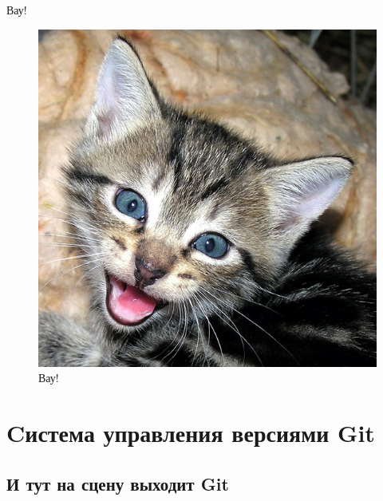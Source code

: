 \documentclass[presentation]{beamer}
\begin{document}
\begin{frame}{Вау!}
      \begin{figure}[htb]
        \centering
        \includegraphics[width=.8\textheight]{kitty-meowing}
        \caption{\LARGE Вау!}
      \end{figure}
\end{frame}



\section{Cистема управления версиями Git}

\subsection{И тут на сцену выходит Git}
\end{document}

